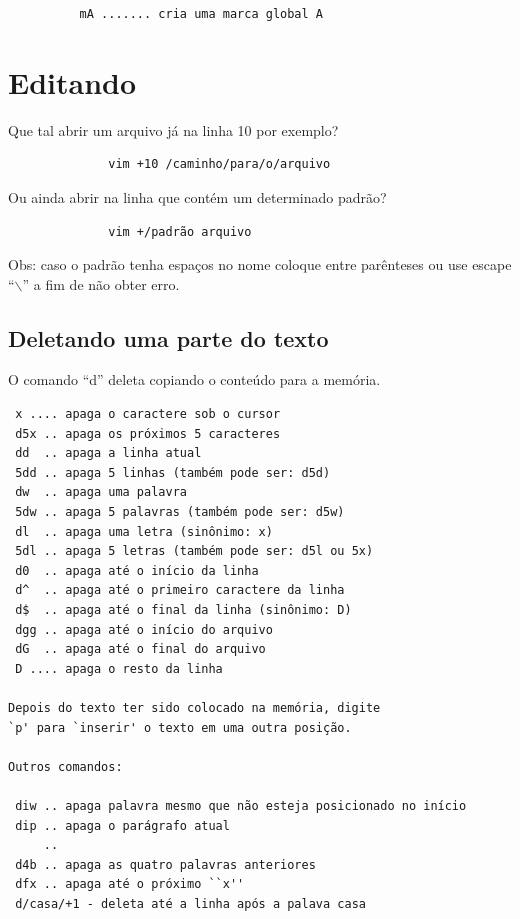 \documentclass[10pt,a4paper,openany]{book}
\begin{document}
\begin{verbatim}
		  mA ....... cria uma marca global A
\end{verbatim}

\chapter{Editando}
\label{Editando}

Que tal abrir um arquivo já na linha 10 por exemplo?

\begin{verbatim}
			  vim +10 /caminho/para/o/arquivo
\end{verbatim}

Ou ainda abrir na linha que contém um determinado padrão?

\begin{verbatim}
			  vim +/padrão arquivo
\end{verbatim}

Obs: caso o padrão tenha espaços no nome coloque entre parênteses ou
use escape ``$\backslash$'' a fim de não obter erro.

\section{Deletando uma parte do texto}\label{Deletando uma parte do texto}

O comando ``d'' deleta copiando o conteúdo para a memória.

\begin{verbatim}
 x .... apaga o caractere sob o cursor
 d5x .. apaga os próximos 5 caracteres
 dd  .. apaga a linha atual
 5dd .. apaga 5 linhas (também pode ser: d5d)
 dw  .. apaga uma palavra
 5dw .. apaga 5 palavras (também pode ser: d5w)
 dl  .. apaga uma letra (sinônimo: x)
 5dl .. apaga 5 letras (também pode ser: d5l ou 5x)
 d0  .. apaga até o início da linha
 d^  .. apaga até o primeiro caractere da linha
 d$  .. apaga até o final da linha (sinônimo: D)
 dgg .. apaga até o início do arquivo
 dG  .. apaga até o final do arquivo
 D .... apaga o resto da linha

Depois do texto ter sido colocado na memória, digite
`p' para `inserir' o texto em uma outra posição.

Outros comandos:

 diw .. apaga palavra mesmo que não esteja posicionado no início
 dip .. apaga o parágrafo atual
     ..
 d4b .. apaga as quatro palavras anteriores
 dfx .. apaga até o próximo ``x''
 d/casa/+1 - deleta até a linha após a palava casa

\end{verbatim}
\end{document}
